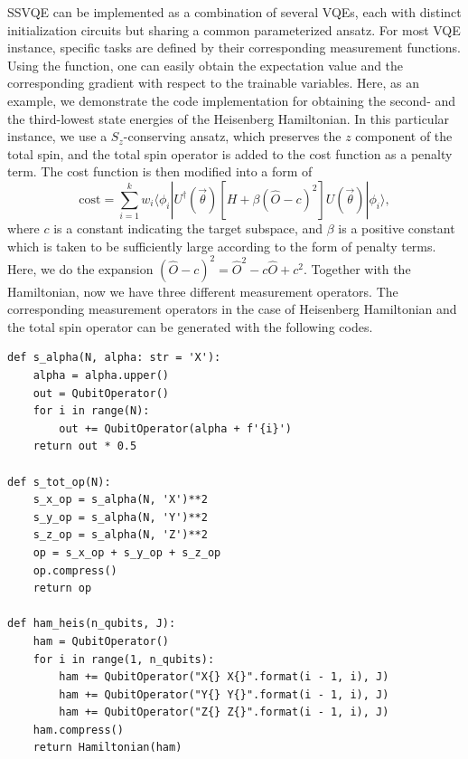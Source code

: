 SSVQE can be implemented as a combination of several VQEs, each with distinct initialization circuits but sharing a common parameterized ansatz.
For most VQE instance, specific tasks are defined by their corresponding measurement functions.
Using the \getexpectationwithgrad function, one can easily obtain the expectation value and the corresponding gradient with respect to the trainable variables. Here, as an example, we demonstrate the code implementation for obtaining the second- and the third-lowest state energies of the Heisenberg Hamiltonian. In this particular instance,
we use a $S_z$-conserving ansatz, which preserves the $z$ component of the total spin, and the total spin operator is added to the cost function as a penalty term. The cost function is then modified into a form of
\begin{equation}
    \mathrm{cost} = \sum_{i=1}^{k} w_{i} \langle \phi_{i}| U^{\dagger}(\vec{\theta}) [H + \beta(\hat{O} - c)^2] U(\vec{\theta}) | \phi_{i} \rangle,
    \label{ssvqe_cost_pen}
\end{equation}
where $c$ is a constant indicating the target subspace, and $\beta$ is a positive constant which is taken to be sufficiently large according to the form of penalty terms. Here, we do the expansion $(\hat{O} - c)^2 {=} \hat{O}^2 {-} c\hat{O} {+} c^2$. Together with the Hamiltonian, now we have three different measurement operators. The corresponding measurement operators in the case of Heisenberg Hamiltonian and the total spin operator can be generated with the following codes.

\begin{lstlisting}
def s_alpha(N, alpha: str = 'X'):
    alpha = alpha.upper()
    out = QubitOperator()
    for i in range(N):
        out += QubitOperator(alpha + f'{i}')
    return out * 0.5

def s_tot_op(N):
    s_x_op = s_alpha(N, 'X')**2
    s_y_op = s_alpha(N, 'Y')**2
    s_z_op = s_alpha(N, 'Z')**2
    op = s_x_op + s_y_op + s_z_op
    op.compress()
    return op

def ham_heis(n_qubits, J):
    ham = QubitOperator()
    for i in range(1, n_qubits):
        ham += QubitOperator("X{} X{}".format(i - 1, i), J)
        ham += QubitOperator("Y{} Y{}".format(i - 1, i), J)
        ham += QubitOperator("Z{} Z{}".format(i - 1, i), J)
    ham.compress()
    return Hamiltonian(ham)
\end{lstlisting}

